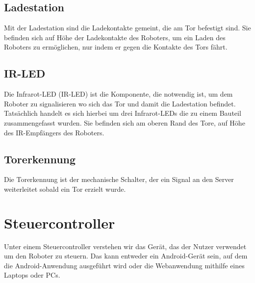 \subsection{Ladestation}
Mit der Ladestation sind die Ladekontakte gemeint, die am Tor befestigt sind. Sie befinden sich auf Höhe der Ladekontakte des Roboters, um ein Laden des Roboters zu ermöglichen, nur indem er gegen die Kontakte des Tors fährt.

\subsection{IR-LED}
Die Infrarot-LED (IR-LED) ist die Komponente, die notwendig ist, um dem Roboter zu signalisieren wo sich das Tor und damit die Ladestation befindet. Tatsächlich handelt es sich hierbei um drei Infrarot-LEDs die zu einem Bauteil zusammengefasst wurden. Sie befinden sich am oberen Rand des Tore, auf Höhe des IR-Empfängers des Roboters.

\subsection{Torerkennung}
Die Torerkennung ist der mechanische Schalter, der ein Signal an den Server weiterleitet sobald ein Tor erzielt wurde. 

\section{Steuercontroller}
Unter einem Steuercontroller verstehen wir das Gerät, das der Nutzer verwendet um den Roboter zu steuern. Das kann entweder ein Android-Gerät sein, auf dem die Android-Anwendung ausgeführt wird oder die Webanwendung mithilfe eines Laptops oder PCs. 
